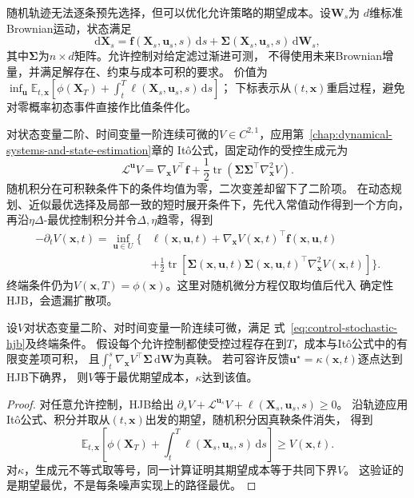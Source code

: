 随机轨迹无法逐条预先选择，但可以优化允许策略的期望成本。设$\bm W_s$为
$d$维标准Brownian运动，状态满足
\begin{equation}
  \mathrm d\bm X_s=\bm f(\bm X_s,\bm u_s,s)\,\mathrm ds
    +\bm\Sigma(\bm X_s,\bm u_s,s)\,\mathrm d\bm W_s,
  \label{eq:control-stochastic-dynamics}
\end{equation}
其中$\bm\Sigma$为$n\times d$矩阵。允许控制对给定滤过渐进可测，
不得使用未来Brownian增量，并满足解存在、约束与成本可积的要求。
价值为
$\inf_{\bm u}\mathbb E_{t,\bm x}[
\phi(\bm X_T)+\int_t^T\ell(\bm X_s,\bm u_s,s)\,\mathrm ds]$；
下标表示从$(t,\bm x)$重启过程，避免对零概率初态事件直接作比值条件化。

对状态变量二阶、时间变量一阶连续可微的$V\in C^{2,1}$，应用第~\ref{chap:dynamical-systems-and-state-estimation}章的
Itô公式，固定动作的受控生成元为
\[
  \mathcal L^{\bm u}V=
  \nabla_{\bm x}V^\top\bm f+
  \frac12\operatorname{tr}
    (\bm\Sigma\bm\Sigma^\top\nabla_{\bm x}^2V).
\]
随机积分在可积鞅条件下的条件均值为零，二次变差却留下了二阶项。
在动态规划、近似最优选择及局部一致的短时展开条件下，先代入常值动作得到一个方向，
再沿$\eta\Delta$-最优控制积分并令$\Delta,\eta$趋零，得到
\begin{equation}
  \begin{aligned}
  -\partial_tV(\bm x,t)=\inf_{\bm u\in U}\biggl\{&
    \ell(\bm x,\bm u,t)+
    \nabla_{\bm x}V(\bm x,t)^\top\bm f(\bm x,\bm u,t)\\
    &+\frac12\operatorname{tr}\!\left[
      \bm\Sigma(\bm x,\bm u,t)\bm\Sigma(\bm x,\bm u,t)^\top
      \nabla_{\bm x}^2V(\bm x,t)\right]\biggr\}.
  \end{aligned}
  \label{eq:control-stochastic-hjb}
\end{equation}
终端条件仍为$V(\bm x,T)=\phi(\bm x)$。这里对随机微分方程仅取均值后代入
确定性HJB，会遗漏扩散项。

\begin{theorem}[随机HJB验证]
\label{thm:control-stochastic-hjb-verification}
设$V$对状态变量二阶、对时间变量一阶连续可微，满足
式~\eqref{eq:control-stochastic-hjb}及终端条件。
假设每个允许控制都使受控过程存在到$T$，成本与Itô公式中的有限变差项可积，
且$\int_t^s\nabla_{\bm x}V^\top\bm\Sigma\,\mathrm d\bm W$为真鞅。
若可容许反馈$\bm u^\star=\kappa(\bm x,t)$逐点达到HJB下确界，
则$V$等于最优期望成本，$\kappa$达到该值。
\end{theorem}
\begin{proof}
对任意允许控制，HJB给出
$\partial_sV+\mathcal L^{\bm u_s}V+\ell(\bm X_s,\bm u_s,s)\geq0$。
沿轨迹应用Itô公式、积分并取从$(t,\bm x)$出发的期望，随机积分因真鞅条件消失，
得到
\[
  \mathbb E_{t,\bm x}\left[
    \phi(\bm X_T)+\int_t^T\ell(\bm X_s,\bm u_s,s)\,\mathrm ds\right]
  \geq V(\bm x,t).
\]
对$\kappa$，生成元不等式取等号，同一计算证明其期望成本等于共同下界$V$。
这验证的是期望最优，不是每条噪声实现上的路径最优。
\end{proof}

